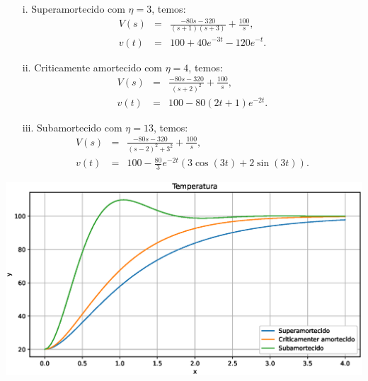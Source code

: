 \begin{itemize}
       \item[i.] Superamortecido com $\eta=3$, temos:
        \begin{eqnarray*}
              V(s) &=& \frac{-80s- 320 }{(s+1)(s+3)} +  \frac{100}{s},\\
              v(t) &=& 100 + 40 e^{-3 t} - 120 e^{-t}.
        \end{eqnarray*}
        \item[ii.] Criticamente amortecido com $\eta=4$, temos:
        \begin{eqnarray*}
              V(s) &=& \frac{-80s- 320 }{(s+2)^2} +  \frac{100}{s},\\
              v(t) &=& 100 - 80 (2t + 1) e^{-2 t}.
       \end{eqnarray*}
       \item[iii.] Subamortecido com $\eta=13$, temos:
        \begin{eqnarray*}
              V(s) &=& \frac{-80s- 320 }{(s-2)^2+3^2} +  \frac{100}{s},\\
              v(t) &=& 100 - \frac{80}{3} e^{-2 t} \left(3 \cos(3 t) + 2 \sin(3 t)\right).
        \end{eqnarray*}
\end{itemize}


\begin{center}
       \includegraphics[width=\textwidth]{cap_sistemas/pics/figura_controlador_integral}
\end{center}
   

